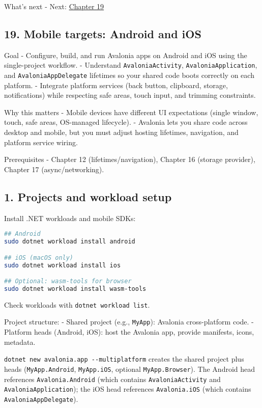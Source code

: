 What's next - Next: \href{Chapter19.md}{Chapter 19}

\newpage

\subsection{19. Mobile targets: Android and
iOS}\label{mobile-targets-android-and-ios}

Goal - Configure, build, and run Avalonia apps on Android and iOS using
the single-project workflow. - Understand
\passthrough{\lstinline!AvaloniaActivity!},
\passthrough{\lstinline!AvaloniaApplication!}, and
\passthrough{\lstinline!AvaloniaAppDelegate!} lifetimes so your shared
code boots correctly on each platform. - Integrate platform services
(back button, clipboard, storage, notifications) while respecting safe
areas, touch input, and trimming constraints.

Why this matters - Mobile devices have different UI expectations (single
window, touch, safe areas, OS-managed lifecycle). - Avalonia lets you
share code across desktop and mobile, but you must adjust hosting
lifetimes, navigation, and platform service wiring.

Prerequisites - Chapter 12 (lifetimes/navigation), Chapter 16 (storage
provider), Chapter 17 (async/networking).

\subsection{1. Projects and workload
setup}\label{projects-and-workload-setup}

Install .NET workloads and mobile SDKs:

\begin{lstlisting}[language=bash]
## Android
sudo dotnet workload install android

## iOS (macOS only)
sudo dotnet workload install ios

## Optional: wasm-tools for browser
sudo dotnet workload install wasm-tools
\end{lstlisting}

Check workloads with \passthrough{\lstinline!dotnet workload list!}.

Project structure: - Shared project (e.g.,
\passthrough{\lstinline!MyApp!}): Avalonia cross-platform code. -
Platform heads (Android, iOS): host the Avalonia app, provide manifests,
icons, metadata.

\passthrough{\lstinline!dotnet new avalonia.app --multiplatform!}
creates the shared project plus heads
(\passthrough{\lstinline!MyApp.Android!},
\passthrough{\lstinline!MyApp.iOS!}, optional
\passthrough{\lstinline!MyApp.Browser!}). The Android head references
\passthrough{\lstinline!Avalonia.Android!} (which contains
\passthrough{\lstinline!AvaloniaActivity!} and
\passthrough{\lstinline!AvaloniaApplication!}); the iOS head references
\passthrough{\lstinline!Avalonia.iOS!} (which contains
\passthrough{\lstinline!AvaloniaAppDelegate!}).

